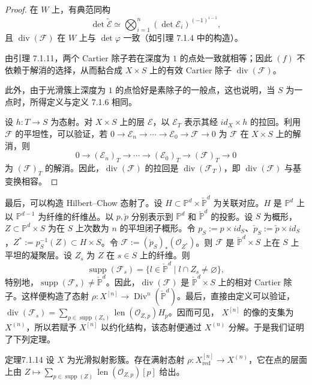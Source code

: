 \begin{proof}
在 $W$ 上，有典范同构
\[
\det\widetilde{\mathcal E}\simeq\bigotimes_{i=1}^n(\det\mathcal E_i)^{(-1)^{i-1}},
\]
且 $\operatorname{div}(\mathcal F)$ 在 $W$ 上与 $\det\varphi$ 一致（如引理 7.1.4 中的构造）。

由引理 7.1.11，两个 Cartier 除子若在深度为 $1$ 的点处一致就相等；因此 $(f)$ 不依赖于解消的选择，从而黏合成 $X\times S$ 上的有效 Cartier 除子 $\operatorname{div}(\mathcal F)$。

此外，由于光滑簇上深度为 $1$ 的点恰好是素除子的一般点，这也说明，当 $S$ 为一点时，所得定义与定义 7.1.6 相同。

设 $h:T\to S$ 为态射。对 $X\times S$ 上的层 $\mathcal E$，以 $\mathcal E_T$ 表示其经 $id_X\times h$ 的拉回。利用 $\mathcal F$ 的平坦性，可以验证，若 $0\to\mathcal E_n\to\cdots\to\mathcal E_0\to\mathcal F\to0$ 为 $\mathcal F$ 在 $X\times S$ 上的解消，则
\[
0\longrightarrow(\mathcal E_n)_T\longrightarrow\cdots
\longrightarrow(\mathcal E_0)_T\longrightarrow(\mathcal F)_T\longrightarrow0
\]
为 $(\mathcal F)_T$ 的解消。因此，$\operatorname{div}(\mathcal F)$ 的拉回是 $\operatorname{div}(\mathcal F_T)$，即 $\operatorname{div}(\mathcal F)$ 与基变换相容。
\end{proof}
最后，可以构造 Hilbert--Chow 态射了。设 $H\subset\mathbb P^d\times\check{\mathbb P}^d$ 为关联对应。$H$ 是 $\mathbb P^d$ 上以 $\mathbb P^{d-1}$ 为纤维的纤维丛。以 $p,\check p$ 分别表示到 $\mathbb P^d$ 和 $\check{\mathbb P}^d$ 的投影。设 $S$ 为概形，$Z\subset\mathbb P^d\times S$ 为在 $S$ 上次数为 $n$ 的平坦闭子概形。令 $p_S:=p\times id_S$、$\check p_S:=\check p\times id_S$，$Z^*:=p_S^{-1}(Z)\subset H\times S$。令 $\mathcal F:=(\check p_S)_*(\mathcal O_{Z^*})$。则 $\mathcal F$ 是 $\check{\mathbb P}^d\times S$ 上在 $S$ 上平坦的凝聚层。设 $Z_s$ 为 $Z$ 在 $s\in S$ 上的纤维。则
\[
\operatorname{supp}(\mathcal F_s)=\{l\in\check{\mathbb P}^d\mid l\cap Z_s\ne\varnothing\},
\]
特别地，$\operatorname{supp}(\mathcal F_s)\ne\check{\mathbb P}^d$。因此，$\operatorname{div}(\mathcal F)$ 是 $\check{\mathbb P}^d\times S$ 上的相对 Cartier 除子。这样便构造了态射 $\rho:X^{[n]}\to\operatorname{Div}^n(\check{\mathbb P}^d)$。最后，直接由定义可以验证，$\operatorname{div}(\mathcal F_s)=\sum_{p\in\operatorname{supp}(Z_s)}\operatorname{len}(\mathcal O_{Z,p})H_p$。因而可见，
$X^{[n]}$ 的像的支集为 $X^{(n)}$，所以若赋予 $X^{[n]}$ 以约化结构，该态射便通过 $X^{(n)}$ 分解。于是我们证明了下列定理。

\begin{origstatement}{定理}{7.1.14}\label{ch07:7.1.14}
设 $X$ 为光滑拟射影簇。存在满射态射 $\rho:X^{[n]}_{\mathrm{red}}\to X^{(n)}$，它在点的层面上由 $Z\mapsto\sum_{p\in\operatorname{supp}(Z)}\operatorname{len}(\mathcal O_{Z,p})[p]$ 给出。
\end{origstatement}
